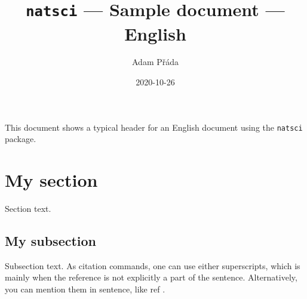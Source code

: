 \documentclass[11pt]{article}
\title{\texttt{natsci} --- Sample document --- English}
\author{Adam Přáda}
\date{2020-10-26}
\begin{document}
    \pagestyle{fancy}
    \maketitle
    This document shows a typical header for an English document using the \texttt{natsci} package.
    
    \section{My section}
    Section text.
    \subsection{My subsection}
    Subsection text.
    \newpage
    As citation commands, one can use either superscripts, which is mainly when the reference is not explicitly a part of the sentence.\supercite{cit1} Alternatively, you can mention them in sentence, like ref \cite{cit2}.
    \printbibliography
\end{document}
